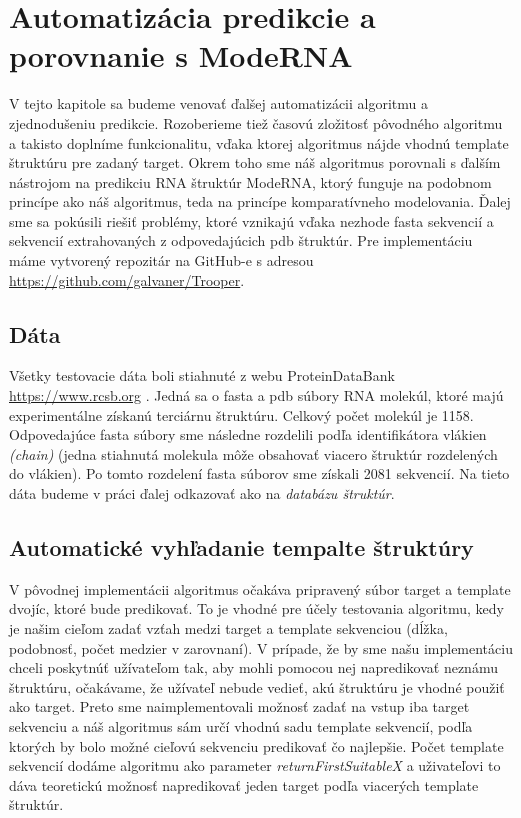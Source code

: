 \chapter{Automatizácia predikcie a porovnanie s ModeRNA}

V tejto kapitole sa budeme venovať ďalšej automatizácii algoritmu a zjednodušeniu predikcie. Rozoberieme tiež časovú zložitosť pôvodného algoritmu a takisto doplníme funkcionalitu, vďaka ktorej algoritmus nájde vhodnú template štruktúru pre zadaný target. Okrem toho sme náš algoritmus porovnali s ďalším nástrojom na predikciu RNA štruktúr ModeRNA, ktorý funguje na podobnom princípe ako náš algoritmus, teda na princípe komparatívneho modelovania. Ďalej sme sa pokúsili riešiť problémy, ktoré vznikajú vďaka nezhode fasta sekvencií a sekvencií extrahovaných z odpovedajúcich pdb štruktúr. Pre implementáciu máme vytvorený repozitár na GitHub-e s adresou \url{https://github.com/galvaner/Trooper}.

\section{Dáta}
Všetky testovacie dáta boli stiahnuté z webu ProteinDataBank \url{https://www.rcsb.org} \cite{PDB00}. Jedná sa o fasta a pdb súbory RNA molekúl, ktoré majú experimentálne získanú terciárnu štruktúru. Celkový počet molekúl je 1158. Odpovedajúce fasta súbory sme následne rozdelili podľa identifikátora vlákien \textit{(chain)} (jedna stiahnutá molekula môže obsahovať viacero štruktúr rozdelených do vlákien). Po tomto rozdelení fasta súborov sme získali 2081 sekvencií. Na tieto dáta budeme v práci ďalej odkazovať ako na \textit{databázu štruktúr}.


\section{Automatické vyhľadanie tempalte štruktúry}
V pôvodnej implementácii  algoritmus očakáva pripravený súbor target a template dvojíc, ktoré bude predikovať. To je vhodné pre účely testovania algoritmu, kedy je našim cieľom zadať vzťah medzi target a template sekvenciou (dĺžka, podobnosť, počet medzier v zarovnaní). V prípade, že by sme našu implementáciu chceli poskytnúť užívateľom tak, aby mohli pomocou nej napredikovať neznámu štruktúru, očakávame, že užívateľ nebude vedieť, akú štruktúru je vhodné použiť ako target. Preto sme naimplementovali možnosť zadať na vstup iba target sekvenciu a náš algoritmus sám určí vhodnú sadu template sekvencií, podľa ktorých by bolo možné cieľovú sekvenciu predikovať čo najlepšie. Počet template sekvencií dodáme algoritmu ako parameter \textit{returnFirstSuitableX} a uživateľovi to dáva teoretickú možnosť napredikovať jeden target podľa viacerých template štruktúr.


